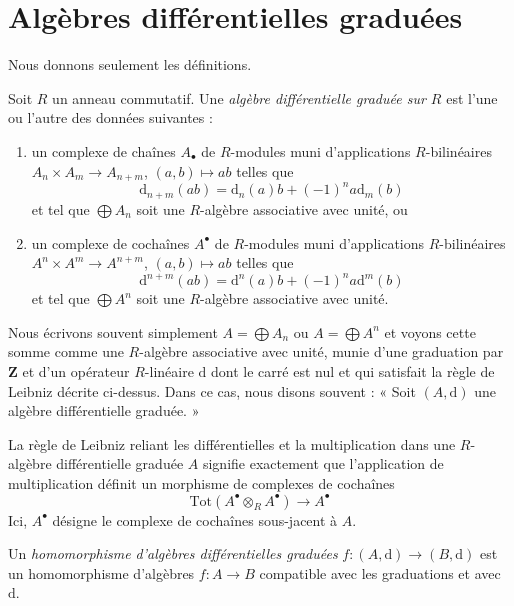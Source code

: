 \section{Algèbres différentielles graduées}
\label{section-dga}


\noindent
Nous donnons seulement les définitions.

\begin{definition}
\label{definition-dga}
Soit $R$ un anneau commutatif. Une {\it algèbre différentielle graduée sur $R$}
est l'une ou l'autre des données suivantes :
\begin{enumerate}
\item un complexe de chaînes $A_\bullet$ de $R$-modules muni d'applications
$R$-bilinéaires $A_n \times A_m \to A_{n + m}$,
$(a, b) \mapsto ab$ telles que
$$
\text{d}_{n + m}(ab) = \text{d}_n(a)b + (-1)^n a\text{d}_m(b)
$$
et tel que $\bigoplus A_n$ soit une $R$-algèbre associative
avec unité, ou
\item un complexe de cochaînes $A^\bullet$ de $R$-modules muni d'applications
$R$-bilinéaires $A^n \times A^m \to A^{n + m}$, $(a, b) \mapsto ab$
telles que
$$
\text{d}^{n + m}(ab) = \text{d}^n(a)b + (-1)^n a\text{d}^m(b)
$$
et tel que $\bigoplus A^n$ soit une $R$-algèbre associative avec unité.
\end{enumerate}
\end{definition}

\noindent
Nous écrivons souvent simplement $A = \bigoplus A_n$ ou $A = \bigoplus A^n$ et
voyons cette somme comme une $R$-algèbre associative avec unité, munie d'une
graduation par $\mathbf{Z}$ et d'un opérateur $R$-linéaire $\text{d}$ dont le carré
est nul et qui satisfait la règle de Leibniz décrite ci-dessus. Dans ce cas,
nous disons souvent : « Soit $(A, \text{d})$ une algèbre différentielle graduée. »

\medskip\noindent
La règle de Leibniz reliant les différentielles et la multiplication dans une
$R$-algèbre différentielle graduée $A$ signifie exactement que l'application de multiplication
définit un morphisme de complexes de cochaînes
$$
\text{Tot}(A^\bullet \otimes_R A^\bullet) \to A^\bullet
$$
Ici, $A^\bullet$ désigne le complexe de cochaînes sous-jacent à $A$.

\begin{definition}
\label{definition-homomorphism-dga}
Un {\it homomorphisme d'algèbres différentielles graduées}
$f : (A, \text{d}) \to (B, \text{d})$ est un homomorphisme d'algèbres $f : A \to B$
compatible avec les graduations et avec $\text{d}$.
\end{definition}

